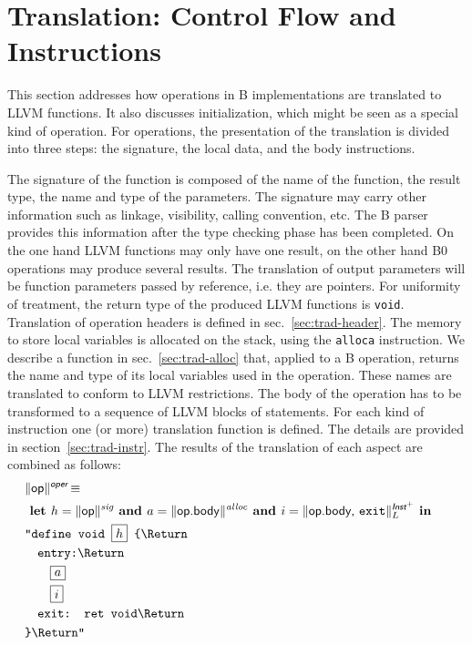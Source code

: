 \documentclass{llncs}
\newcommand{\trad}[2]{\ensuremath{\lVert \textsf{#1} \rVert^{\textit{#2}}}}
\newcommand{\nl}[0]{\text{\Return}}
\DeclareMathOperator{\isdef}{\equiv}
\newcommand{\llvm}[1]{\texttt{#1}}
\newcommand{\B}[1]{\textsf{#1}}
\newcommand{\ListOf}[1]{$\mbox{#1}^+$}
\newcommand{\LET}[0]{\textbf{ let }}
\newcommand{\IN}[0]{\textbf{ in }}
\newcommand{\AND}[0]{\textbf{ and }}
\newcommand{\PH}[1]{\framebox{$#1$}}
\begin{document}
\section{Translation: Control Flow and Instructions
\label{sec:control}}

This section addresses how operations in B implementations are translated to
LLVM functions. It also discusses initialization, which might be seen as a
special kind of operation. For operations, the presentation of the translation
is divided into three steps: the signature, the local data, and the body
instructions.

The signature of the function is composed of the name of the function, the
result type, the name and type of the parameters. The signature may carry other
information such as linkage, visibility, calling convention, etc. The B parser
provides this information after the type checking phase has been completed.  On
the one hand LLVM functions may only have one result, on the other hand B0
operations may produce several results. The translation of output parameters
will be function parameters passed by reference, i.e. they are pointers. For
uniformity of treatment, the return type of the produced LLVM functions is
\llvm{void}. Translation of operation headers is defined in
sec.~\ref{sec:trad-header}. The memory to store local variables is allocated on
the stack, using the \llvm{alloca} instruction. We describe a function in
sec.~\ref{sec:trad-alloc} that, applied to a B operation, returns the name and
type of its local variables used in the operation. These names are translated to
conform to LLVM restrictions. The body of the operation has to be transformed to
a sequence of LLVM blocks of statements. For each kind of instruction one (or
more) translation function is defined. The details are provided in
section~\ref{sec:trad-instr}.  The results of the translation of each aspect are
combined as follows:
\begin{align*}
\begin{split}
  \lefteqn{\trad{\B{op}}{\B{oper}} \isdef} \\
  & \LET h = \trad{\B{op}}{sig} \AND   a = \trad{\B{op.body}}{alloc} \AND i = \trad{\B{op.body}, \llvm{exit}}{\ListOf{\B{Inst}}}_L \IN  \\
  & \llvm{"define void \PH{h} \{\nl} \\
  & \quad \llvm{entry:\nl} \\
  & \quad \quad \PH{a} \\
  & \quad \quad \PH{i} \\
  & \quad \llvm{exit: ret void\nl} \\
  & \llvm{\}\nl"}
\end{split}
\end{align*}
\end{document}
